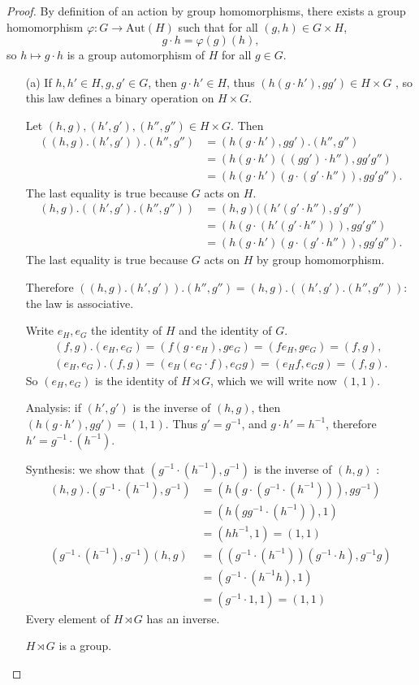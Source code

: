 \documentclass[11pt,a4paper]{article}
\begin{document}
\begin{proof}
By definition of an action by group homomorphisms, there exists a group homomorphism $\varphi:G \to \mathrm{Aut}(H)$ such that for all $(g,h) \in G \times H$,
$$g \cdot h = \varphi(g)(h),$$
so $ h\mapsto g\cdot h$ is a group automorphism of $H$ for all $g\in G$.
\begin{enumerate}
\item[(a)] 
 If $h,h' \in H, g,g' \in G$, then $g\cdot h' \in H$, thus $(h(g\cdot h'),gg') \in H\times G$ , so this law defines a binary operation on $H\times G$.

 Let $(h,g), (h',g'), (h'',g'') \in H\times G$. Then
\begin{align*}
((h,g).(h',g')).(h'',g'') &= (h(g\cdot h'),gg').(h'',g'')\\
&=(h(g\cdot h')((gg')\cdot h''),gg'g'')\\
&=(h(g\cdot h')(g\cdot (g'\cdot h'')),gg'g'').
\end{align*}
The last equality is true because $G$ acts on $H$.
\begin{align*}
(h,g).((h',g').(h'',g'')) &= (h,g)((h'(g'\cdot h''),g'g'')\\
&=(h (g\cdot(h'(g'\cdot h''))),gg'g'')\\
&=(h (g\cdot h') (g\cdot(g' \cdot h'')), gg'g'').
\end{align*}
The last equality is true because $G$ acts on $H$ by group homomorphism.

Therefore $((h,g).(h',g')).(h'',g'') = (h,g).((h',g').(h'',g''))$: the law is associative.

 Write $e_H,e_G$ the identity of $H$ and the identity of $G$.
\begin{align*}
(f,g).(e_H,e_G) = (f (g\cdot e_H), g e_G) =  (f e_H, g e_G) = (f,g),\\
(e_H,e_G).(f,g) = (e_H(e_G\cdot f), e_G g) = (e_H f, e_Gg) = (f,g).
\end{align*}
So $(e_H,e_G)$ is the identity of $H \rtimes G$, which we will write now $(1,1)$.


Analysis: if $(h',g')$ is the inverse of $(h,g)$, then $(h(g\cdot h'),gg') = (1,1)$. Thus $g' = g^{-1}$, and $g\cdot h' = h^{-1}$, therefore $h' = g^{-1} \cdot (h^{-1})$. 

Synthesis: we show that $( g^{-1} \cdot (h^{-1}),g^{-1})$ is the inverse of $(h,g)$ :
\begin{align*}
(h,g).( g^{-1} \cdot (h^{-1}),g^{-1}) &= (h (g\cdot(g^{-1}\cdot (h^{-1}))), g g^{-1})\\
&= (h (g g^{-1}\cdot (h^{-1})), 1)\\
&=(hh^{-1},1) = (1,1)\\
( g^{-1} \cdot (h^{-1}),g^{-1})(h,g) &= ((g^{-1} \cdot (h^{-1})) (g^{-1}\cdot h), g^{-1}g)\\
&=(g^{-1}\cdot(h^{-1}h),1)\\
&=(g^{-1}\cdot 1,1) = (1,1)
\end{align*}
Every element of $H \rtimes G$ has an inverse.
\begin{center}
$H\rtimes G$ is a group.
\end{center}


\end{enumerate}
\end{proof}
\end{document}
